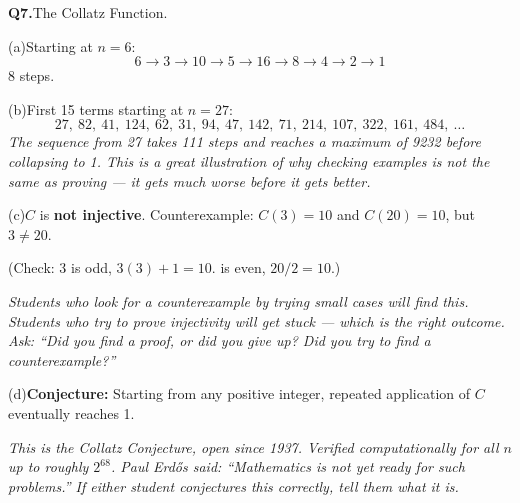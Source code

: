 \documentclass[12pt]{article}
\begin{document}
\bigskip
\textbf{Q7.}\quad The Collatz Function.

(a)\quad Starting at $n = 6$:
\[
  6 \to 3 \to 10 \to 5 \to 16 \to 8 \to 4 \to 2 \to 1
\]
8 steps.

(b)\quad First 15 terms starting at $n = 27$:
\[
  27,\ 82,\ 41,\ 124,\ 62,\ 31,\ 94,\ 47,\ 142,\ 71,\ 214,\ 107,\ 322,\ 161,\ 484,\ \ldots
\]
\textit{The sequence from 27 takes 111 steps and reaches a maximum of 9232 before
collapsing to 1. This is a great illustration of why checking examples is not the
same as proving --- it gets much worse before it gets better.}

(c)\quad $C$ is \textbf{not injective}. Counterexample: $C(3) = 10$ and $C(20) = 10$,
but $3 \neq 20$.

(Check: 3 is odd, $3(3)+1 = 10$.  is even, $20/2 = 10$.)

\textit{Students who look for a counterexample by trying small cases will find this.
Students who try to prove injectivity will get stuck --- which is the right outcome.
Ask: ``Did you find a proof, or did you give up? Did you try to find a counterexample?''}

(d)\quad \textbf{Conjecture:} Starting from any positive integer, repeated application
of $C$ eventually reaches 1.

\textit{This is the Collatz Conjecture, open since 1937. Verified computationally for
all $n$ up to roughly $2^{68}$. Paul Erd\H{o}s said: ``Mathematics is not yet ready for
such problems.'' If either student conjectures this correctly, tell them what it is.}
\end{document}
